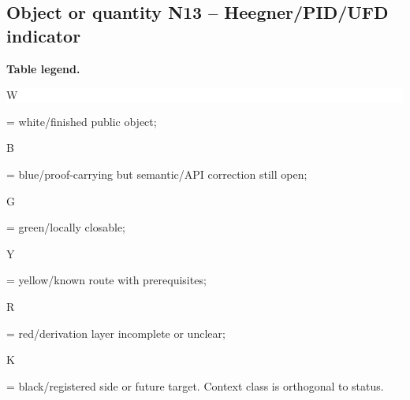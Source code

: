 \subsection*{Object or quantity N13 -- Heegner/\allowbreak{}PID/\allowbreak{}UFD indicator}
\hypertarget{objproof:N13}{}
\par\smallskip\noindent\begin{minipage}{0.99\linewidth}\footnotesize\raggedright\textbf{Table legend.} \colorbox{white}{\strut W} = white/finished public object; \colorbox{cyan!20}{\strut B} = blue/proof-carrying but semantic/API correction still open; \colorbox{green!18}{\strut G} = green/locally closable; \colorbox{yellow!25}{\strut Y} = yellow/known route with prerequisites; \colorbox{red!20}{\strut R} = red/derivation layer incomplete or unclear; \colorbox{black!18}{\strut K} = black/registered side or future target. Context class is orthogonal to status.\end{minipage}\par\vspace{0.25em}
